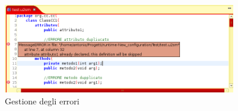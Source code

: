 \begin{figure}[htp]
\begin{center}
  \includegraphics[width=0.9\textwidth]{img/errori_editor.png}
  \caption[labelInTOC]{Gestione degli errori}
\end{center}
\end{figure}